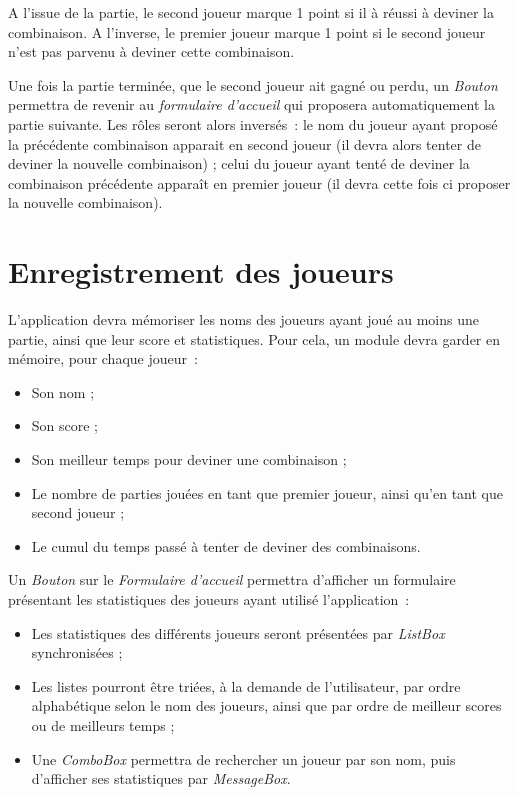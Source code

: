 \documentclass[10pt,a4paper,oneside]{article}
\begin{document}
A l'issue de la partie, le second joueur marque 1 point si il à réussi à deviner la combinaison. A l'inverse, le premier joueur marque 1 point si le second joueur n'est pas parvenu à deviner cette combinaison.

\medskip

Une fois la partie terminée, que le second joueur ait gagné ou perdu, un {\em Bouton} permettra de revenir au {\em formulaire d'accueil} qui proposera automatiquement la partie suivante. Les rôles seront alors inversés~: le nom du joueur ayant proposé la précédente combinaison apparait en second joueur (il devra alors tenter de deviner la nouvelle combinaison) ; celui du joueur ayant tenté de deviner la combinaison précédente apparaît en premier joueur (il devra cette fois ci proposer la nouvelle combinaison).

\section{Enregistrement des joueurs}
L'application devra mémoriser les noms des joueurs ayant joué au moins une partie, ainsi que leur score et statistiques. Pour cela, un module devra garder en mémoire, pour chaque joueur~:

\medskip

\begin{itemize}
  \item Son nom ;
  \item Son score ;
  \item Son meilleur temps pour deviner une combinaison ;
  \item Le nombre de parties jouées en tant que premier joueur, ainsi qu'en tant que second joueur ;
  \item Le cumul du temps passé à tenter de deviner des combinaisons. 
\end{itemize}

\medskip

Un {\em Bouton} sur le {\em Formulaire d'accueil} permettra d'afficher un formulaire présentant les statistiques des joueurs ayant utilisé l'application~:

\medskip

\begin{itemize}
  \item Les statistiques des différents joueurs seront présentées par {\em ListBox} synchronisées ;
  \item Les listes pourront être triées, à la demande de l'utilisateur, par ordre alphabétique selon le nom des joueurs, ainsi que par ordre de meilleur scores ou de meilleurs temps ; 
  \item Une {\em ComboBox} permettra de rechercher un joueur par son nom, puis d'afficher ses statistiques par {\em MessageBox}.
\end{itemize}
\end{document}
